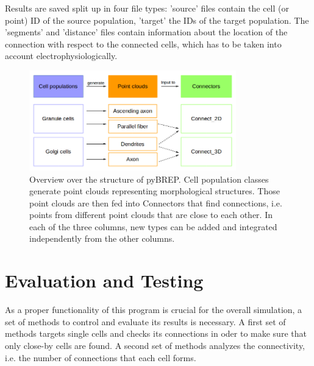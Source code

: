 \documentclass[12pt]{report}
\begin{document}
Results are saved split up in four file types:
'\textunderscore source' files contain the cell (or point) ID of the source population, '\textunderscore target' the IDs of the target population. The '\textunderscore segments' and '\textunderscore distance' files contain information about the location of the connection with respect to the connected cells, which has to be taken into account electrophysiologically. 


\begin{figure}[!ht]
	\centering
	\includegraphics[width=0.8\textwidth]{./figures/pyBREP_structure.png}
	\caption{Overview over the structure of pyBREP. Cell population classes generate point clouds representing morphological structures. Those point clouds are then fed into Connectors that find connections, i.e. points from different point clouds that are close to each other. In each of the three columns, new types can be added and integrated independently from the other columns.}
	\centering
	\label{f:structure}
\end{figure}


\section{Evaluation and Testing}
As a proper functionality of this program is crucial for the overall simulation, a set of methods to control and evaluate its results is necessary. 
A first set of methods targets single cells and checks its connections in oder to make sure that only close-by cells are found. 
A second set of methods analyzes the connectivity, i.e. the number of connections that each cell forms.  %
\end{document}
